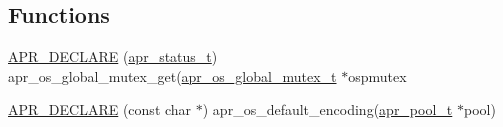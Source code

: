 \subsection*{Functions}
\begin{DoxyCompactItemize}
\item 
\mbox{\hyperlink{group__apr__portabile_gaa7f88d3feeb3c61528419b2c90268085}{A\+P\+R\+\_\+\+D\+E\+C\+L\+A\+RE}} (\mbox{\hyperlink{group__apr__errno_gaf76ee4543247e9fb3f3546203e590a6c}{apr\+\_\+status\+\_\+t}}) apr\+\_\+os\+\_\+global\+\_\+mutex\+\_\+get(\mbox{\hyperlink{structapr__os__global__mutex__t}{apr\+\_\+os\+\_\+global\+\_\+mutex\+\_\+t}} $\ast$ospmutex
\item 
\mbox{\hyperlink{group__apr__portabile_ga68d407683d2c13002ef8bf6ff5b4e820}{A\+P\+R\+\_\+\+D\+E\+C\+L\+A\+RE}} (const char $\ast$) apr\+\_\+os\+\_\+default\+\_\+encoding(\mbox{\hyperlink{group__apr__pools_gaf137f28edcf9a086cd6bc36c20d7cdfb}{apr\+\_\+pool\+\_\+t}} $\ast$pool)
\end{DoxyCompactItemize}
